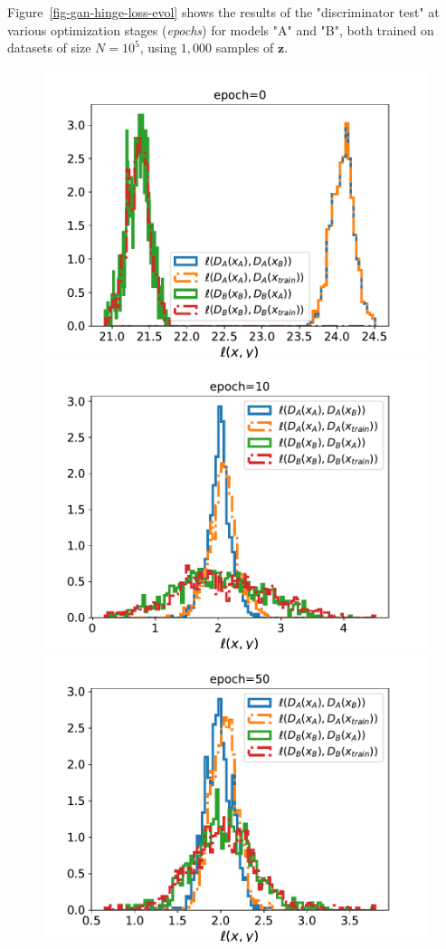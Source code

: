 \documentclass[fleqn,usenatbib]{mnras}
\begin{document}
Figure~\ref{fig-gan-hinge-loss-evol} shows the results of the "discriminator test" at various optimization stages (\textit{epochs}) for models "A" and "B", both trained on datasets of size $N=10^5$, using $1,000$ samples of $\bm{z}$.
\begin{figure}
\centering
\setlength\tabcolsep{0pt}
   \includegraphics[width=0.8\linewidth]{fig-gan_loss_discri_A_B_num_0.pdf}
    \includegraphics[width=0.8\linewidth]{fig-gan_loss_discri_A_B_num_10.pdf}
    \includegraphics[width=0.8\linewidth]{fig-gan_loss_discri_A_B_num_50.pdf}

\end{figure}
\end{document}
